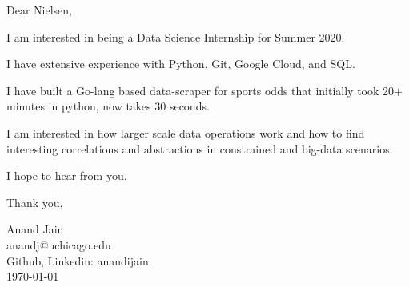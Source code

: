\documentclass[11pt,a4paper,english]{letter} %
\begin{document}
Dear Nielsen,

I am interested in being a Data Science Internship for Summer 2020.

I have extensive experience with Python, Git, Google Cloud, and SQL.

I have built a Go-lang based data-scraper for sports odds that initially took 20+ minutes in python, now takes 30 seconds.

I am interested in how larger scale data operations work and how to find interesting correlations and abstractions in constrained and big-data scenarios.

I hope to hear from you.

Thank you, 

Anand Jain\\
anandj@uchicago.edu\\
Github, Linkedin: anandijain\\
\today\\
\end{document}
